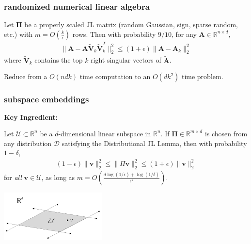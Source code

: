 \documentclass[compress]{beamer}
\newcommand{\bs}[1]{\boldsymbol{#1}}
\newcommand{\bv}[1]{\mathbf{#1}}
\newcommand{\R}{\mathbb{R}}
\begin{document}
	\begin{frame}
	\frametitle{randomized numerical linear algebra}
	\begin{theorem}
		Let $\bs{\Pi}$ be a properly scaled JL matrix (random Gaussian, sign, sparse random, etc.) with $m = O\left(\frac{k}{\epsilon}\right)$ rows. Then with probability $9/10$, for any $\bv{A}\in \R^{n\times d}$,
		\begin{align*}
			\|\bv{A} - \bv{A}\tilde{\bv{V}}_k\tilde{\bv{V}}_k^T\|_2^2 \leq (1+\epsilon) \|\bv{A} - \bv{A}_k\|_2^2
		\end{align*}
		where $\tilde{\bv{V}}_k$ contains the top $k$ right singular vectors of $\tilde{\bv{A}}$.
	\end{theorem}
	Reduce from a $O(ndk)$ time computation to an $O(dk^2)$ time problem.
	\end{frame}
	
	
	
	\begin{frame}
		\frametitle{subspace embeddings}
		\textbf{Key Ingredient:} 
		\begin{theorem}
			Let $\mathcal{U} \subset \R^n$ be a $d$-dimensional linear subspace in $\R^n$. If $\bs{\Pi}\in \R^{m\times d}$ is chosen from any distribution $\mathcal{D}$ satisfying the Distributional  JL Lemma, then with probability $1-\delta$,
			\begin{align*}
				(1-\epsilon)\|\bv{v}\|_2^2 \leq \|\Pi \bv{v}\|_2^2 \leq	(1+\epsilon)\|\bv{v}\|_2^2
			\end{align*}
			for \emph{all} $\bv{v} \in \mathcal{U}$, as long as  $m = O\left(\frac{d\log(1/\epsilon) + \log(1/\delta)}{\epsilon^2}\right)$.
		\end{theorem}
		\begin{center}
			\includegraphics[width=0.4\textwidth]{subspace_vis.png}
		\end{center}
	\end{frame}
	
\end{document}
